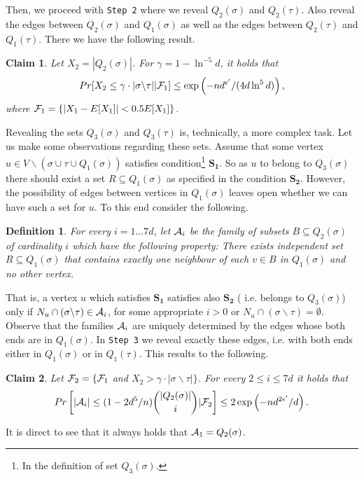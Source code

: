 \documentclass[a4paper,10pt]{article}
\newtheorem{claim}{Claim}\renewcommand{\theclaim}{\arabic{claim}}
\newtheorem{definition}{Definition}\renewcommand{\thedefinition}{\arabic{definition}}
\begin{document}
\noindent
Then, we proceed with {\tt Step 2} where we reveal $Q_2(\sigma)$ and 
$Q_2(\tau)$. Also reveal the edges between $Q_2(\sigma)$ and $Q_1(\sigma)$
as well as the edges between $Q_2(\tau)$ and $Q_1(\tau)$. There we have 
the following result.



\begin{claim}\label{claim:Q2Claim}
Let $X_2=|Q_2(\sigma)|$. For $\gamma=1-\ln^{-5}d$, it holds that
\begin{displaymath}
Pr[X_2\leq \gamma\cdot |\sigma\backslash \tau | |{\cal F}_1]\leq \exp\left(-n{d^{\epsilon'}}/(4d\ln^5 d) \right),
\end{displaymath}
where ${\cal F}_1=\{|X_1-E[X_1]|< 0.5 E[X_1]\}$.
\end{claim}

\noindent
Revealing the sets $Q_3(\sigma)$ and $Q_3(\tau)$ is, technically,
a more complex task. Let us make some observations regarding these
sets. Assume that some vertex $u \in V\backslash (\sigma\cup \tau \cup Q_{1}(\sigma))$
satisfies condition\footnote{In the definition of set $Q_3(\sigma)$.}
$\mathbf{S_1}$. So as $u$ to belong to $Q_3(\sigma)$ there should exist a set $R\subseteq Q_1(\sigma)$
as specified in the condition $\mathbf{S_2}$. However, the possibility 
of edges between vertices in $Q_1(\sigma)$ leaves open whether we 
can have such a set for $u$. To this end consider the following.

\begin{definition}
For every $i=1\ldots 7d$, let ${\cal A}_i$ be the family of subsets
$B\subseteq Q_2(\sigma)$ of cardinality  $i$ which have the following 
property:  There exists independent set $R\subseteq Q_1(\sigma)$
that contains exactly one  neighbour of each $v \in B$ in $Q_1(\sigma)$
and no other vertex.
\end{definition}

\noindent
That is, a vertex $u$ which satisfies $\mathbf{S_1}$ satisfies  also $\mathbf{S_2}$ (
i.e.  belongs to $Q_3(\sigma)$) only if $N_u\cap(\sigma\backslash \tau)\in {\cal A}_i$, 
for some appropriate $i>0$ or $N_u\cap(\sigma\backslash \tau)=\emptyset$.
Observe that the families ${\cal A}_i$ are uniquely determined by the
edges whose both ends are in $Q_1(\sigma)$. In  {\tt Step 3} we reveal
exactly these edges, i.e. with both ends either in $Q_1(\sigma)$ or in $Q_1(\tau)$.
This results  to the following.


\begin{claim}\label{claim:GoodFraction}
Let ${\cal F}_2=\{{\cal F}_1$ and $X_2>\gamma\cdot |\sigma\backslash \tau| \}$.
For every $2\leq i\leq 7d$ it holds that
\begin{displaymath}
Pr\left[|{\cal A}_i| \leq (1-2d^5/n){|Q_2(\sigma)|\choose i} |{\cal F}_2\right]
\leq 2\exp\left( -nd^{2\epsilon'}/d \right).
\end{displaymath}
\end{claim}
It is direct to see that it always holds that ${\cal A}_1=Q_2(\sigma)$.
\end{document}
